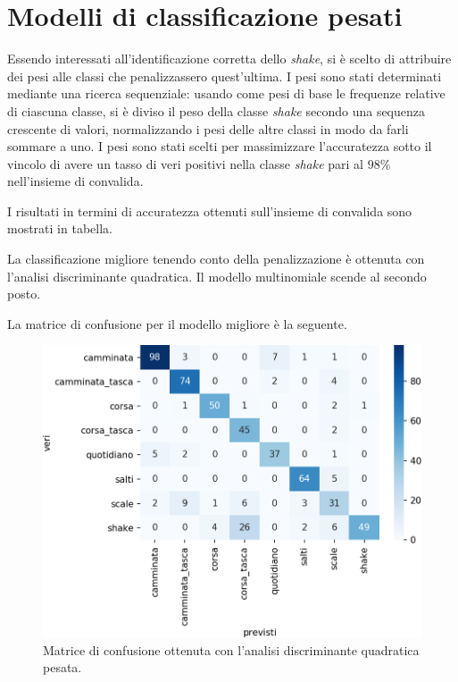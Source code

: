 \documentclass[main.tex]{subfiles}
\begin{document}
\section{Modelli di classificazione pesati}

Essendo interessati all\rq{}identificazione corretta dello {\em shake}, si è scelto di attribuire dei pesi alle classi che penalizzassero quest\rq{}ultima. I pesi sono stati determinati mediante una ricerca sequenziale: usando come pesi di base le frequenze relative di ciascuna classe, si è diviso il peso della classe {\em shake} secondo una sequenza crescente di valori, normalizzando i pesi delle altre classi in modo da farli sommare a uno. I pesi sono stati scelti per massimizzare l\rq{}accuratezza sotto il vincolo di avere un tasso di veri positivi nella classe {\em shake} pari al $98\%$ nell\rq{}insieme di convalida.

I risultati in termini di accuratezza ottenuti sull\rq{}insieme di convalida sono mostrati in tabella.


La classificazione migliore tenendo conto della penalizzazione è ottenuta con l\rq{}analisi discriminante quadratica. Il modello multinomiale scende al secondo posto.

La matrice di confusione per il modello migliore è la seguente.
\begin{figure}[H]
	\centering
	\includegraphics[width=.5\textwidth]{../../figure/confusionMatrix-QDA-penalizzata.png}
	\caption{Matrice di confusione ottenuta con l'analisi discriminante quadratica pesata.}
	\label{fig:qda_pen}
\end{figure}
\end{document}
